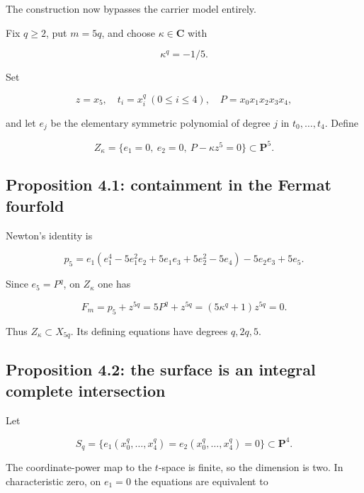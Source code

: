 The construction now bypasses the carrier model entirely.

Fix \(q\ge2\), put \(m=5q\), and choose \(\kappa\in\mathbf C\) with

\[
\kappa^q=-1/5.
\]

Set

\[
z=x_5,\quad t_i=x_i^q\ (0\le i\le4),\quad P=x_0x_1x_2x_3x_4,
\]

and let \(e_j\) be the elementary symmetric polynomial of degree \(j\)
in \(t_0,\ldots,t_4\). Define

\begin{equation}\label{eq:capacity_cycles-4.1}
\boxed{
Z_\kappa=\{e_1=0,\ e_2=0,\ P-\kappa z^5=0\}\subset\mathbf P^5.
}\end{equation}

\hypertarget{capacity_cycles-proposition-4.1-containment-in-the-fermat-fourfold}{%
\subsection{Proposition 4.1: containment in the Fermat
fourfold}\label{capacity_cycles-proposition-4.1-containment-in-the-fermat-fourfold}}

Newton's identity is

\begin{equation}\label{eq:capacity_cycles-4.2}
p_5=e_1(e_1^4-5e_1^2e_2+5e_1e_3+5e_2^2-5e_4)-5e_2e_3+5e_5.\end{equation}

Since \(e_5=P^q\), on \(Z_\kappa\) one has

\[
F_m=p_5+z^{5q}=5P^q+z^{5q}
=(5\kappa^q+1)z^{5q}=0.
\]

Thus \(Z_\kappa\subset X_{5q}\). Its defining equations have degrees
\(q,2q,5\).

\hypertarget{capacity_cycles-proposition-4.2-the-surface-is-an-integral-complete-intersection}{%
\subsection{Proposition 4.2: the surface is an integral complete
intersection}\label{capacity_cycles-proposition-4.2-the-surface-is-an-integral-complete-intersection}}

Let

\[
S_q=\{e_1(x_0^q,\ldots,x_4^q)=e_2(x_0^q,\ldots,x_4^q)=0\}\subset\mathbf P^4.
\]

The coordinate-power map to the \(t\)-space is finite, so the dimension
is two. In characteristic zero, on \(e_1=0\) the equations are
equivalent to

